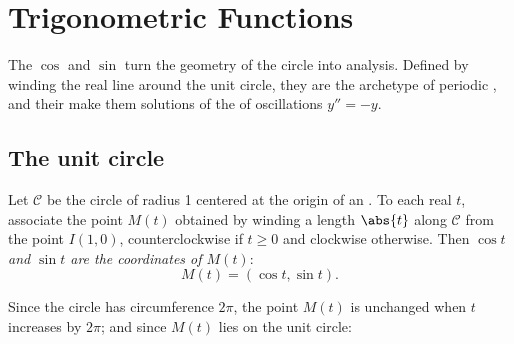 \chapter{Trigonometric Functions}\label{ch:g12:trigo}

The  $\cos$ and $\sin$ turn the geometry of the circle into
analysis. Defined by winding the real line around the unit circle, they are
the archetype of periodic , and their  make them
solutions of the  of oscillations $y'' = -y$.

\section{The unit circle}

\begin{definition}\label{def:g12:trigo:cossin}
Let $\mathcal{C}$ be the circle of radius 1 centered at the origin of an
 . To each real $t$, associate the point $M(t)$
obtained by winding a length $\abs{t}$ along $\mathcal{C}$ from the point
$I(1,0)$, counterclockwise if $t \geq 0$ and clockwise otherwise. Then
\emph{$\cos t$ and $\sin t$ are the coordinates of
$M(t)$}:
\[
M(t) = (\cos t, \sin t).
\]
\end{definition}

\begin{omfigure}
\end{omfigure}

Since the circle has circumference $2\pi$, the point $M(t)$ is unchanged when
$t$ increases by $2\pi$; and since $M(t)$ lies on the unit circle:

